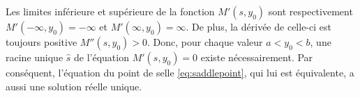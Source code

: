 Les limites inférieure et supérieure de la fonction $M'(s,y_0)$ sont
respectivement $M'(-\infty,y_0) = -\infty$ et $M'(\infty,y_0) =
\infty$. De plus, la dérivée de celle-ci est toujours positive
$M''(s,y_0)>0$. Donc, pour chaque valeur $a < y_0 < b$, une racine
unique $\hat{s}$ de l'équation $M'(s,y_0)=0$ existe
nécessairement. Par conséquent, l'équation du point de selle
\eqref{eq:saddlepoint}, qui lui est équivalente, a aussi une solution
réelle unique.






